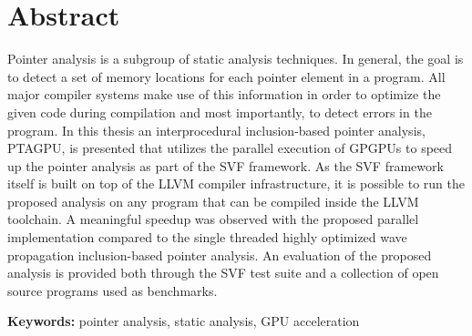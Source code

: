 \chapter*{Abstract}

Pointer analysis is a subgroup of static analysis techniques. 
In general, the goal is to detect a set of memory locations for each pointer element in a program. 
All major compiler systems make use of this information in order to optimize the given code during compilation
and most importantly, to detect errors in the program.
In this thesis an interprocedural inclusion-based pointer analysis, PTAGPU, is presented that utilizes the parallel execution of GPGPUs to speed up the pointer analysis as part of the SVF framework. 
As the SVF framework itself is built on top of the LLVM compiler infrastructure, 
it is possible to run the proposed analysis on any program that can be compiled inside the LLVM toolchain.
A meaningful speedup was observed with the proposed parallel implementation compared to the single threaded highly optimized wave propagation inclusion-based pointer analysis.
An evaluation of the proposed analysis is provided both through the SVF test suite and a collection of open source programs used as benchmarks.

\textbf{Keywords:} pointer analysis, static analysis, GPU acceleration